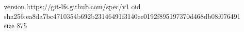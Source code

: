 version https://git-lfs.github.com/spec/v1
oid sha256:ea8da7bc4710354b692b23146491f3140ee0192f895197370d468db08f076491
size 875
